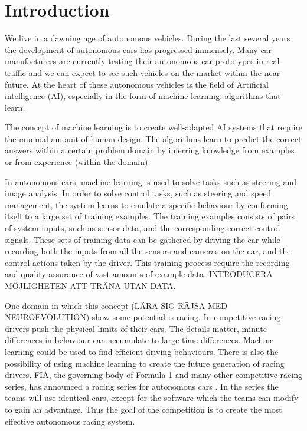 \chapter{Introduction}


We live in a dawning age of autonomous vehicles. During the last several years the development of autonomous cars has progressed immensely. Many car manufacturers are currently testing their autonomous car prototypes in real traffic and we can expect to see such vehicles on the market within the near future. At the heart of these autonomous vehicles is the field of Artificial intelligence (AI), especially in the form of machine learning, algorithms that learn.

The concept of machine learning is to create well-adapted AI systems that require the minimal amount of human design. The algorithms learn to predict the correct answers within a certain problem domain by inferring knowledge from examples or from experience (within the domain). 

In autonomous cars, machine learning is used to solve tasks such as steering and image analysis. In order to solve control tasks, such as steering and speed management, the system learns to emulate a specific behaviour by conforming itself to a large set of training examples. The training examples consists of pairs of system inputs, such as sensor data, and the corresponding correct control signals. These sets of training data can be gathered by driving the car while recording both the inputs from all the sensors and cameras on the car, and the control actions taken by the driver. This training process require the recording and quality assurance of vast amounts of example data. INTRODUCERA MÖJLIGHETEN ATT TRÄNA UTAN DATA.

One domain in which this concept (LÄRA SIG RÄJSA MED NEUROEVOLUTION) show some potential is racing. In competitive racing drivers push the physical limits of their cars. The details matter, minute differences in behaviour can accumulate to large time differences. Machine learning could be used to find efficient driving behaviours. There is also the possibility of using machine learning to create the future generation of racing drivers. FIA, the governing body of Formula 1 and many other competitive racing series, has announced a racing series for autonomous cars \cite{roborace}. In the series the teams will use identical cars, except for the software which the teams can modify to gain an advantage. Thus the goal of the competition is to create the most effective autonomous racing system. 

